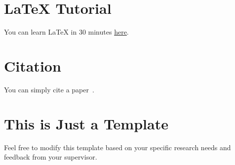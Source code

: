 \section{LaTeX Tutorial}

You can learn LaTeX in 30 minutes \href{https://www.overleaf.com/learn/latex/Learn_LaTeX_in_30_minutes}{here}.


\section{Citation}

You can simply cite a paper~\citep{karunarathna2024crucial}.


\section{This is Just a Template}

Feel free to modify this template based on your specific research needs and feedback from your supervisor.